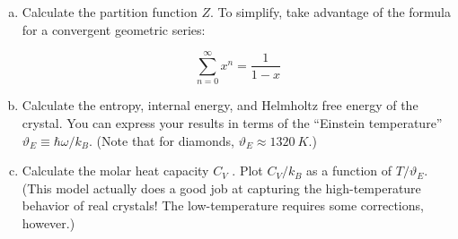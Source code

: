 \begin{enumerate}
    \begin{enumerate}[(a)]

        \item Calculate the partition function $Z$. To simplify, take advantage of the formula for a convergent
            geometric series:

        \begin{equation*}
            \sum_{n=0}^\infty x^n = \frac{1}{1 - x}
        \end{equation*}

        \item Calculate the entropy, internal energy, and Helmholtz free energy of the crystal. 
            You can express your results in terms of the “Einstein temperature” $\vartheta_E  ≡ \hbar \omega/k_B$. 
            (Note that for diamonds, $\vartheta_E \approx \SI{1320}{K}$.)

        \item Calculate the molar heat capacity $C_V$ . Plot $C_V /k_B$ as a function of $T /\vartheta_E$. (This model actually
            does a good job at capturing the high-temperature behavior of real crystals! The low-temperature
            requires some corrections, however.)
    \end{enumerate}




    
\end{enumerate}



